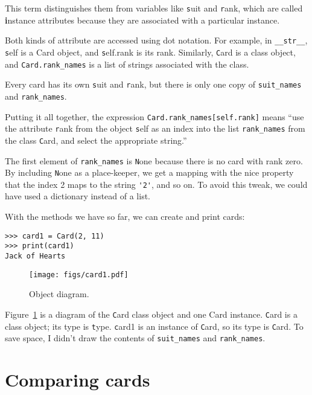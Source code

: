 \documentclass[
DIV=11,
fontsize=12,
twoside,
headinclude=false,
titlepage=firstiscover,
abstract=true,
headsepline=true,
footsepline=true,
chapterprefix=true, %
headings=big,
bibliography=totoc,%
captions=tableheading
]{scrbook}
\theoremstyle{definition}
\begin{document}
This term distinguishes them from variables like {\texttt suit} and {\texttt
  rank}, which are called {\textbf instance attributes} because they are
associated with a particular instance.

Both kinds of attribute are accessed using dot notation.  For
example, in \verb"__str__", {\texttt self} is a Card object,
and {\texttt self.rank} is its rank.  Similarly, {\texttt Card}
is a class object, and \verb"Card.rank_names" is a
list of strings associated with the class.

Every card has its own {\texttt suit} and {\texttt rank}, but there
is only one copy of \verb"suit_names" and \verb"rank_names".

Putting it all together, the expression
\verb"Card.rank_names[self.rank]" means ``use the attribute {\texttt rank}
from the object {\texttt self} as an index into the list \verb"rank_names"
from the class {\texttt Card}, and select the appropriate string.''

The first element of \verb"rank_names" is {\texttt None} because there
is no card with rank zero.  By including {\texttt None} as a place-keeper,
we get a mapping with the nice property that the index 2 maps to the
string \verb"'2'", and so on.  To avoid this tweak, we could have
used a dictionary instead of a list.

With the methods we have so far, we can create and print cards:

\begin{lstlisting}
>>> card1 = Card(2, 11)
>>> print(card1)
Jack of Hearts
\end{lstlisting}

\begin{figure}
\centerline
{\texttt{[image: figs/card1.pdf]}}
\caption{Object diagram.}
\label{fig.card1}
\end{figure}

Figure~\ref{fig.card1} is a diagram of the {\texttt Card} class object and
one Card instance.  {\texttt Card} is a class object; its type is {\texttt
  type}.  {\texttt card1} is an instance of {\texttt Card}, so its type is
{\texttt Card}.  To save space, I didn't draw the contents of
\verb"suit_names" and \verb"rank_names".  
  


\section{Comparing cards}
\label{comparecard}
\end{document}
